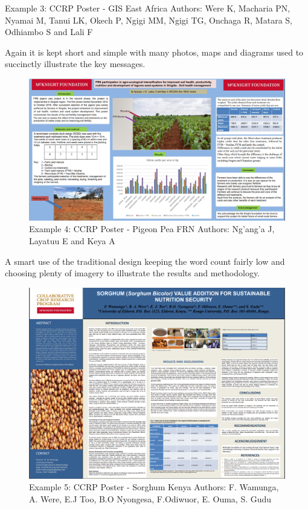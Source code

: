 \documentclass[
  titlepage]{book}
\begin{document}
Example 3: CCRP Poster - GIS East Africa Authors: Were K, Macharia PN, Nyamai M, Tanui LK, Okech P, Ngigi MM, Ngigi TG, Onchaga R, Matara S, Odhiambo S and Lali F

Again it is kept short and simple with many photos, maps and diagrams used to succinctly illustrate the key messages.

\begin{figure}
\centering
\includegraphics{img/Pigeon Pea FRN.png}
\caption{Example 4: CCRP Poster - Pigeon Pea FRN Authors: Ng'ang'a J, Layatuu E and Keya A}
\end{figure}

A smart use of the traditional design keeping the word count fairly low and choosing plenty of imagery to illustrate the results and methodology.

\begin{figure}
\centering
\includegraphics{img/Sorghum Kenya.png}
\caption{Example 5: CCRP Poster - Sorghum Kenya Authors: F. Wamunga, A. Were, E.J Too, B.O Nyongesa, F.Odiwuor, E. Ouma, S. Gudu}
\end{figure}
\end{document}
